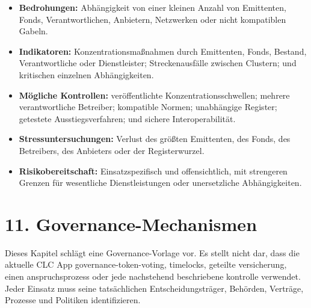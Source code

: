 \documentclass[11pt]{article}
\begin{document}
\begin{itemize}[leftmargin=*]
\item \textbf{Bedrohungen:} Abhängigkeit von einer kleinen Anzahl von Emittenten, Fonds, Verantwortlichen, Anbietern, Netzwerken oder nicht kompatiblen Gabeln.
\item \textbf{Indikatoren:} Konzentrationsmaßnahmen durch Emittenten, Fonds, Bestand, Verantwortliche oder Dienstleister; Streckenausfälle zwischen Clustern; und kritischen einzelnen Abhängigkeiten.
\item \textbf{Mögliche Kontrollen:} veröffentlichte Konzentrationsschwellen; mehrere verantwortliche Betreiber; kompatible Normen; unabhängige Register; getestete Ausstiegsverfahren; und sichere Interoperabilität.
\item \textbf{Stressuntersuchungen:} Verlust des größten Emittenten, des Fonds, des Betreibers, des Anbieters oder der Registerwurzel.
\item \textbf{Risikobereitschaft:} Einsatzspezifisch und offensichtlich, mit strengeren Grenzen für wesentliche Dienstleistungen oder unersetzliche Abhängigkeiten.
\end{itemize}

\section*{11. Governance-Mechanismen}

Dieses Kapitel schlägt eine Governance-Vorlage vor. Es stellt nicht dar, dass die aktuelle CLC App governance-token-voting, timelocks, geteilte versicherung, einen anspruchsprozess oder jede nachstehend beschriebene kontrolle verwendet. Jeder Einsatz muss seine tatsächlichen Entscheidungsträger, Behörden, Verträge, Prozesse und Politiken identifizieren.
\end{document}
